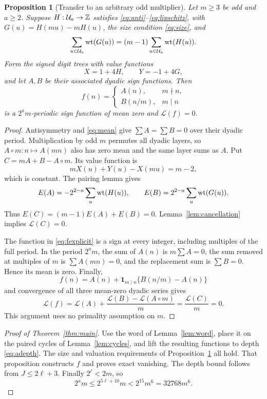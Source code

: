 \documentclass[11pt,a4paper]{article}
\newtheorem{proposition}[theorem]{Proposition}
\theoremstyle{definition}\newtheorem{definition}[theorem]{Definition}
\theoremstyle{remark}\newtheorem{remark}[theorem]{Remark}
\newcommand{\LL}{\mathcal L}\newcommand{\UU}{\mathcal U}
\begin{document}
\begin{proposition}[Transfer to an arbitrary odd multiplier]\label{prop:transfer}
Let $m\ge3$ be odd and $a\ge2$. Suppose $H:\UU_a\to\Z$
satisfies \eqref{eq:anti}--\eqref{eq:lipschitz}, with
$G(u)=H(mu)-mH(u)$, the size condition \eqref{eq:size}, and
\[
 \sum_{u\in\UU_a}\wt(G(u))=(m-1)\sum_{u\in\UU_a}\wt(H(u)).
\]
Form the signed digit trees with value functions
\[
 X=1+4H,\qquad Y=-1+4G,
\]
and let $A,B$ be their associated dyadic sign functions. Then
\begin{equation}\label{eq:fexplicit}
 f(n)=\begin{cases}A(n),&m\nmid n,\\B(n/m),&m\mid n\end{cases}
\end{equation}
is a $2^am$-periodic sign function of mean zero and $\LL(f)=0$.
\end{proposition}
\begin{proof}
Antisymmetry and \eqref{eq:mean} give $\sum A=\sum B=0$ over
their dyadic period. Multiplication by odd $m$ permutes all dyadic
layers, so $A\circ m:n\mapsto A(mn)$ also has zero mean and the
same layer sums as $A$.
Put $C=mA+B-A\circ m$. Its value function is
\[
 mX(u)+Y(u)-X(mu)=m-2,
\]
which is constant. The pairing lemma gives
\[
 E(A)=-2^{2-a}\sum_u\operatorname{wt}(H(u)),\qquad
 E(B)= 2^{2-a}\sum_u\operatorname{wt}(G(u)).
\]
Thus $E(C)=(m-1)E(A)+E(B)=0$. Lemma~\ref{lem:cancellation}
implies $\LL(C)=0$.

The function in \eqref{eq:fexplicit} is a sign at every integer,
including multiples of the full period. In the period $2^am$, the
sum of $A(n)$ is $m\sum A=0$, the sum removed at multiples of $m$
is $\sum A(mn)=0$, and the replacement sum is $\sum B=0$.
Hence its mean is zero. Finally,
\[
 f(n)=A(n)+\mathbf1_{m\mid n}\{B(n/m)-A(n)\}
\]
and convergence of all three mean-zero dyadic series gives
\[
 \LL(f)=\LL(A)+\frac{\LL(B)-\LL(A\circ m)}m
         =\frac{\LL(C)}m=0.
\]
This argument uses no primality assumption on $m$.
\end{proof}

\begin{proof}[Proof of Theorem~\ref{thm:main}]
Use the word of Lemma~\ref{lem:word}, place it on the paired cycles
of Lemma~\ref{lem:cycles}, and lift the resulting functions to depth
\eqref{eq:adepth}. The size and valuation requirements of
Proposition~\ref{prop:transfer} all hold. That proposition constructs
$f$ and proves exact vanishing. The depth bound follows from
$J\le2\ell+3$. Finally $2^\ell<2m$, so
\[
 2^am\le2^{5\ell+10}m<2^{15}m^6=32768m^6.
\]
\end{proof}
\end{document}
